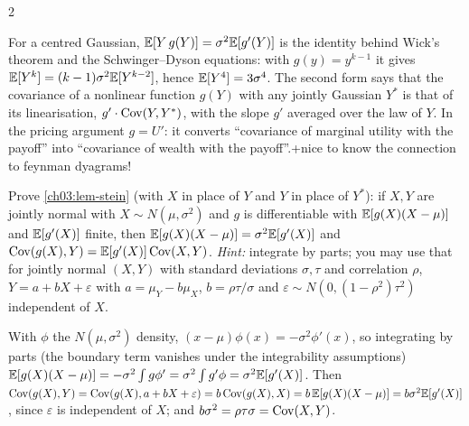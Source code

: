\begin{paracol}{2}
\begin{intuition}
For a centred Gaussian, $\mathbb{E}[Y\,g(Y)]=\sigma^2\mathbb{E}[g'(Y)]$ is the identity behind Wick's theorem and the
Schwinger--Dyson equations: with $g(y)=y^{k-1}$ it gives $\mathbb{E}[Y^k]=(k-1)\sigma^2\mathbb{E}[Y^{k-2}]$, hence $\mathbb{E}[Y^4]=3\sigma^4$. The second
form says that the covariance of a nonlinear function $g(Y)$ with any jointly Gaussian $Y^*$ is that of its
linearisation, $g'\cdot\operatorname{Cov}(Y,Y^*)$, with the slope $g'$ averaged over the law of $Y$. In the pricing argument
$g=U'$: it converts ``covariance of marginal utility with the payoff'' into ``covariance of wealth with the
payoff''.\note+{nice to know the connection to feynman dyagrams!}
\end{intuition}

\begin{exercise}\label{ch03:ex-stein}
Prove \cref{ch03:lem-stein} (with $X$ in place of $Y$ and $Y$ in place of $Y^*$): if $X,Y$ are jointly normal with
$X\sim N(\mu,\sigma^2)$ and $g$ is differentiable with $\mathbb{E}[g(X)(X-\mu)]$ and $\mathbb{E}[g'(X)]$ finite, then
$\mathbb{E}[g(X)(X-\mu)]=\sigma^2\mathbb{E}[g'(X)]$ and $\operatorname{Cov}(g(X),Y)=\mathbb{E}[g'(X)]\operatorname{Cov}(X,Y)$.
\emph{Hint:} integrate by parts; you may use that for jointly normal $(X,Y)$ with standard deviations $\sigma,\tau$ and
correlation $\rho$, $Y=a+bX+\varepsilon$ with $a=\mu_Y-b\mu_X$, $b=\rho\tau/\sigma$ and $\varepsilon\sim N(0,(1-\rho^2)\tau^2)$ independent of $X$.
\end{exercise}
\begin{solution}[ch03:ex-stein]
With $\phi$ the $N(\mu,\sigma^2)$ density, $(x-\mu)\phi(x)=-\sigma^2\phi'(x)$, so integrating by parts (the boundary term vanishes
under the integrability assumptions) $\mathbb{E}[g(X)(X-\mu)]=-\sigma^2\int g\phi'=\sigma^2\int g'\phi=\sigma^2\mathbb{E}[g'(X)]$.
Then $\operatorname{Cov}(g(X),Y)=\operatorname{Cov}(g(X),a+bX+\varepsilon)=b\operatorname{Cov}(g(X),X)=b\,\mathbb{E}[g(X)(X-\mu)]=b\sigma^2\mathbb{E}[g'(X)]$, since $\varepsilon$ is independent of
$X$; and $b\sigma^2=\rho\tau\sigma=\operatorname{Cov}(X,Y)$.
\end{solution}


\end{paracol}
